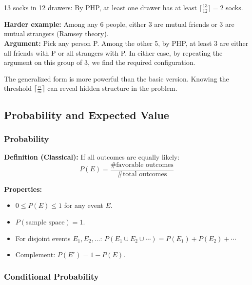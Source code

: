 \documentclass[12pt]{extarticle}
\begin{document}
\begin{examplebox}
13 socks in 12 drawers: By PHP, at least one drawer has at least $\lceil \frac{13}{12} \rceil = 2$ socks.
\end{examplebox}

\begin{examplebox}
\textbf{Harder example:} Among any 6 people, either 3 are mutual friends or 3 are mutual strangers (Ramsey theory).\\
\textbf{Argument:} Pick any person P. Among the other 5, by PHP, at least 3 are either all friends with P or all strangers with P. In either case, by repeating the argument on this group of 3, we find the required configuration.
\end{examplebox}

\begin{remarkbox}
The generalized form is more powerful than the basic version. Knowing the threshold $\lceil \frac{n}{m} \rceil$ can reveal hidden structure in the problem.
\end{remarkbox}


\newpage


\subsection{Probability and Expected Value}

\subsubsection{Probability}

\textbf{Definition (Classical):} If all outcomes are equally likely:
\[
P(E) = \frac{\# \text{favorable outcomes}}{\# \text{total outcomes}}
\]

\textbf{Properties:}
\begin{itemize}
    \item $0 \le P(E) \le 1$ for any event $E$.
    \item $P(\text{sample space}) = 1$.
    \item For disjoint events $E_1, E_2, \ldots$: $P(E_1 \cup E_2 \cup \cdots) = P(E_1) + P(E_2) + \cdots$
    \item Complement: $P(E^c) = 1 - P(E)$.
\end{itemize}

\subsubsection{Conditional Probability}
\end{document}
